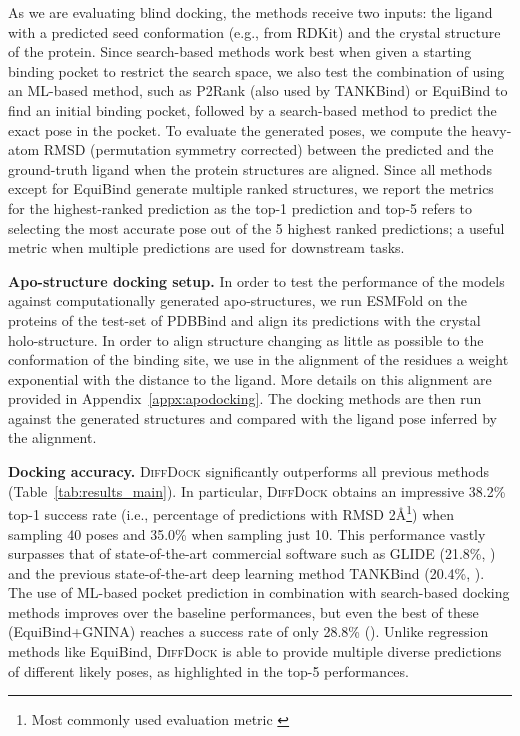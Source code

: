 \documentclass{article} \usepackage{iclr2023_conference,times}
\newcommand{\new}[1]{#1}
\begin{document}
As we are evaluating blind docking, the methods receive two inputs: the ligand with a predicted seed conformation (e.g., from RDKit) and the crystal structure of the protein. Since search-based methods work best when given a starting binding pocket to restrict the search space, we also test the combination of using an ML-based method, such as P2Rank \citep{krivak2018p2rank} (also used by TANKBind) or EquiBind to find an initial binding pocket, followed by a search-based method to predict the exact pose in the pocket. To evaluate the generated poses, we compute the heavy-atom RMSD (permutation symmetry corrected) between the predicted and the ground-truth ligand when the protein structures are aligned. Since all methods except for EquiBind generate multiple ranked structures, we report the metrics for the highest-ranked prediction as the top-1 prediction and top-5 refers to selecting the most accurate pose out of the 5 highest ranked predictions; a useful metric when multiple predictions are used for downstream tasks.

\textbf{Apo-structure docking setup.} In order to test the performance of the models against computationally generated apo-structures, we run ESMFold \citep{Lin2022ESM2} on the proteins of the test-set of PDBBind and align its predictions with the crystal holo-structure. In order to align structure changing as little as possible to the conformation of the binding site, we use in the alignment of the residues a weight exponential with the distance to the ligand. More details on this alignment are provided in Appendix~\ref{appx:apodocking}. The docking methods are then run against the generated structures and compared with the ligand pose inferred by the alignment.


\textbf{Docking accuracy.}  \textsc{DiffDock} significantly outperforms all previous methods (Table~\ref{tab:results_main}). In particular, \textsc{DiffDock} obtains an impressive 3\new{8.2}\% top-1 success rate (i.e., percentage of predictions with RMSD 2\AA{}\footnote{Most commonly used evaluation metric \citep{Alhossary2015QuickVina2, Hassan2017QVinaW, mcnutt2021gnina}}) when sampling 40 poses and 3\new{5.0}\% when sampling just 10. This performance vastly surpasses that of state-of-the-art commercial software such as \textsc{GLIDE} (21.8\%, \new{}) and the previous state-of-the-art deep learning method TANKBind (20.4\%, \new{}). The use of ML-based pocket prediction in combination with search-based docking methods improves over the baseline performances, but even the best of these (\new{EquiBind+GNINA})  reaches a success rate of only 28.8\% \new{()}. Unlike regression methods like EquiBind, \textsc{DiffDock} is able to provide multiple diverse predictions of different likely poses, as highlighted in the top-5 performances. 
\end{document}
